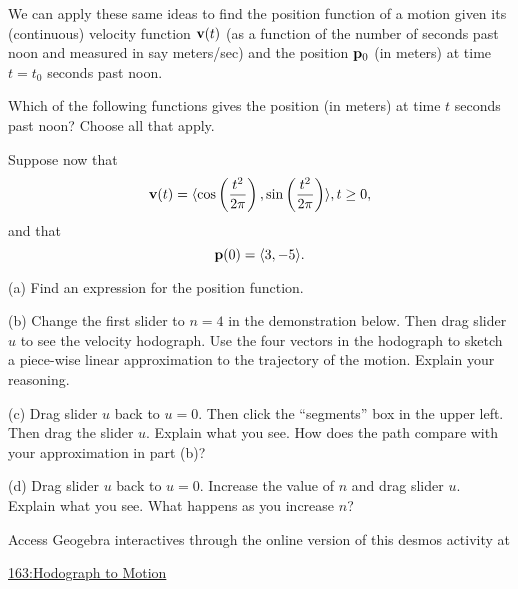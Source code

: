 \documentclass{ximera}
\begin{document}
 
\begin{onlineOnly}
    \begin{center}
\end{center}
\end{onlineOnly}




\begin{question}    \label{Qedtrg78}
We can apply these same ideas to find the position function of a motion given its (continuous) velocity function ${\bf v}(t)$ (as a function of the number of seconds past noon and measured in say meters/sec) and the position ${\bf p}_0$ (in meters) at time $t=t_0$ seconds past noon.  

Which of the following functions gives the position (in meters) at time $t$ seconds past noon? Choose all that apply.
\begin{selectAll}  
  \end{selectAll}
\end{question}


\begin{question}  \label{Qdeggbfr4}
Suppose now that 
\[
    {\bf v}(t) = \langle \cos\left( \frac{t^2}{2\pi} \right) , \sin\left( \frac{t^2}{2\pi} \right) \rangle , t\geq 0 ,
\]
and that 
\[
{\bf p}(0) = \langle 3, -5 \rangle .
\]

(a) Find an expression for the position function.

(b) Change the first slider to $n=4$ in the demonstration below. Then drag slider $u$ to see the velocity hodograph. Use the four vectors in the hodograph to sketch a piece-wise linear approximation to the trajectory of the motion. Explain your reasoning.

(c) Drag slider $u$ back to $u=0$. Then click the ``segments'' box in the upper left. Then drag the slider $u$. Explain what you see. How does the path compare with your approximation in part (b)?

(d) Drag slider $u$ back to $u=0$. Increase the value of $n$ and drag slider $u$. Explain what you see. What happens as you increase $n$? 

\begin{exploration}

Access Geogebra interactives through the online version of this desmos activity at

\href{https://www.geogebra.org/classic/pdefd7mb}{163:Hodograph to Motion}

\begin{onlineOnly}
    \begin{center}
\end{center}
\end{onlineOnly}

\end{exploration}

\end{question}
\end{document}
